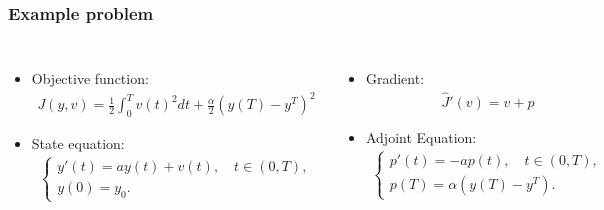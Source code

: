 \documentclass[9pt]{beamer}
\begin{document}
\begin{frame}
\frametitle{Example problem}
\begin{columns}
\begin{itemize}
\item<1->{Objective function:{\tiny\begin{align*}
J(y,v) = \frac{1}{2}\int_0^Tv(t)^2dt + \frac{\alpha}{2}(y(T)-y^T)^2 
\end{align*}
}%
}
\item<1->{State equation:{\tiny\begin{align*}
\left\{
     \begin{array}{lr}
       	y'(t)=ay(t) + v(t), \quad  t\in(0,T),\\
       	y(0)=y_0.
     \end{array}
   \right. 
\end{align*}
}%
}
\end{itemize}
\begin{itemize}
\item<2->{Gradient:{\tiny
\begin{align*}
\hat{J}'(v) = v+p
\end{align*}
}%
}
\item<3->{Adjoint Equation:{\tiny
\begin{align*}
\left\{
     \begin{array}{lr}
       	p'(t)=-ap(t), \quad  t\in(0,T),\\
       	p(T)=\alpha(y(T)-y^T).
     \end{array}
   \right. 
\end{align*}
}%
}
\end{itemize}
\end{columns}
\end{frame}
\end{document}
